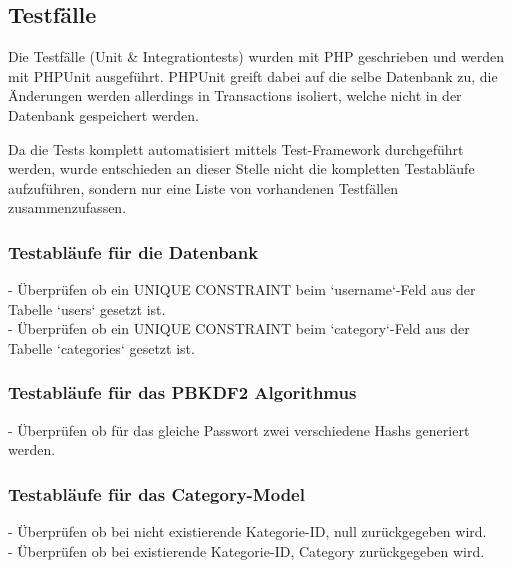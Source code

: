 \subsection{Testfälle}
Die Testfälle (Unit \& Integrationtests) wurden mit PHP geschrieben und werden mit PHPUnit ausgeführt. PHPUnit greift dabei auf die selbe Datenbank zu, die Änderungen werden allerdings in Transactions isoliert, welche nicht in der Datenbank gespeichert werden.

Da die Tests komplett automatisiert mittels Test-Framework durchgeführt werden, wurde entschieden an dieser Stelle nicht die kompletten Testabläufe aufzuführen, sondern nur eine Liste von vorhandenen Testfällen zusammenzufassen.

\subsubsection*{Testabläufe für die Datenbank}
- Überprüfen ob ein UNIQUE CONSTRAINT beim `username`-Feld aus der Tabelle `users` gesetzt ist.\\
- Überprüfen ob ein UNIQUE CONSTRAINT beim `category`-Feld aus der Tabelle `categories` gesetzt ist.

\subsubsection*{Testabläufe für das PBKDF2 Algorithmus}
- Überprüfen ob für das gleiche Passwort zwei verschiedene Hashs generiert werden.

\subsubsection*{Testabläufe für das Category-Model}
- Überprüfen ob bei nicht existierende Kategorie-ID, null zurückgegeben wird.\\
- Überprüfen ob bei existierende Kategorie-ID, Category zurückgegeben wird.

